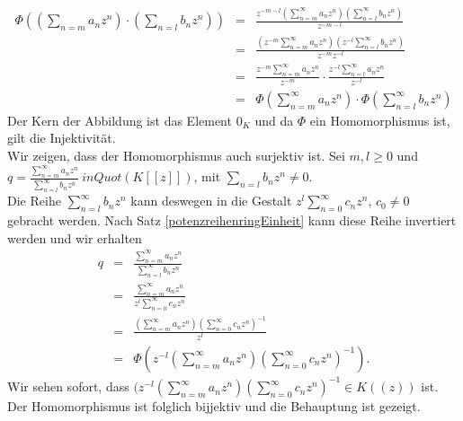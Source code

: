 {\begin{eqnarray*}
\Phi\left( \left( \sum_{n=m} a_nz^n \right)\cdot \left( \sum_{n=l} b_nz^n \right)\right)
&=&\frac{z^{-m-l}\left(\sum_{n=m}^{\infty}a_nz^n\right) \left(\sum_{n=l}^{\infty}b_nz^n\right)}{z^{-m-l}} \\ 
&=& \frac{\left(z^{-m}\sum_{n=m}^{\infty}a_n z^n\right)\left(z^{-l}\sum_{n=l}^{\infty}b_n z^n\right)}{z^{-m}z^{-l}}  \\
&=& \frac{z^{-m}\sum_{n=m}^{\infty}a_n z^n}{z^{-m}} \cdot \frac{z^{-l}\sum_{n=l}^{\infty}a_n z^n}{z^{-l}}\\
&=& \Phi \left(\sum_{n=m}^{\infty} a_nz^n\right) \cdot \Phi\left(\sum_{n=l}^{\infty} b_nz^n \right)
\end{eqnarray*}
Der Kern der Abbildung ist das Element $0_K$ und da $\Phi$ ein Homomorphismus ist, gilt die Injektivität.\\
Wir zeigen, dass der Homomorphismus auch surjektiv ist. Sei $m,l \geq 0$ und $q = \frac{{\sum_{n=m}^{\infty} a_nz^n}}{{\sum_{n=l}^{\infty} b_nz^n}} \ in Quot\left(K[[z]]\right)$, mit $\sum_{n=l} b_nz^n \neq 0$. \\
Die Reihe $\sum_{n = l}^{\infty} b_nz^n $ kann deswegen in die Gestalt $z^l\sum_{n = 0}^{\infty} c_nz^n $, $c_0 \neq 0$ gebracht werden. Nach Satz \ref{potenzreihenringEinheit} kann diese Reihe invertiert werden und wir erhalten
\begin{eqnarray*}
q &=& \frac{{\sum_{n=m}^{\infty} a_nz^n}}{{\sum_{n=l}^{\infty} b_nz^n}} \\
&=& \frac{{\sum_{n=m}^{\infty} a_nz^n}}{z^l\sum_{n = 0}^{\infty} c_nz^n } \\
&=& \frac{\left(\sum_{n = m}^{\infty} a_nz^n\right)\left( \sum_{n = 0}^{\infty} c_nz^n\right)^{-1}}{{z^l}}\\
&=& \Phi\left(z^{-l}\left(\sum_{n = m}^{\infty} a_nz^n\right)\left(\sum_{n = 0}^{\infty} c_nz^n\right)^{-1}\right).
\end{eqnarray*}
%
Wir sehen sofort, dass $(z^{-l}\left(\sum_{n = m}^{\infty} a_nz^n\right)\left(\sum_{n = 0}^{\infty} c_nz^n\right)^{-1} \in K((z))$ ist. Der Homomorphismus ist folglich bijjektiv und die Behauptung ist gezeigt. 
}
%
%

